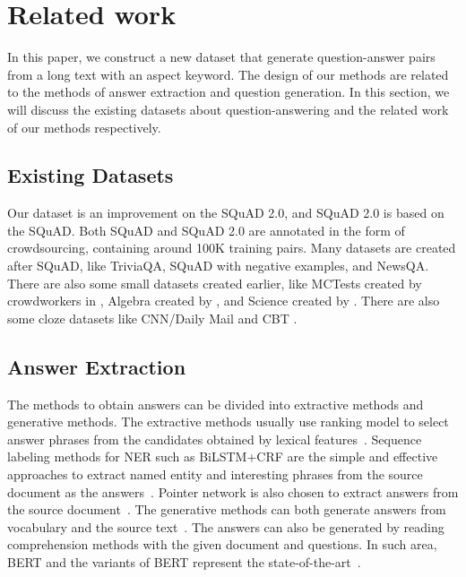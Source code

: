 \section{Related work}
\label{sec:related}


In this paper, we construct a new dataset that generate question-answer pairs from a long text with an aspect keyword.
The design of our methods are related to the methods of answer extraction and question generation.
In this section, we will discuss the existing datasets about question-answering and the related work of our methods respectively.

\subsection{Existing Datasets}
Our dataset is an improvement on the SQuAD 2.0\cite{rajpurkar2018know}, and SQuAD 2.0 is based on the SQuAD\cite{rajpurkar2016squad}. Both SQuAD and SQuAD 2.0 are annotated in the form of crowdsourcing, containing around 100K training pairs. Many datasets are created after SQuAD, like TriviaQA\cite{joshi2017triviaqa}, SQuAD with negative examples\cite{clark2017simple}, and NewsQA\cite{trischler2016newsqa}. There are also some small datasets created earlier, like MCTests created by crowdworkers in \citep{richardson2013mctest}, Algebra created by \citep{kushman2014learning}, and Science created by \citep{clark2016my}. There are also some cloze datasets like CNN/Daily Mail \citep{chen2016thorough} and CBT \citep{hill2015goldilocks}.

\subsection{Answer Extraction}
The methods to obtain answers can be divided into extractive methods and generative methods. 
The extractive methods usually use ranking model to select answer phrases from the candidates obtained by lexical features~\cite{witten2005kea,liu2011automatic,wang2016ptr,subramanian2017neural}.
Sequence labeling methods for NER such as BiLSTM+CRF are the simple and effective approaches to extract named entity and interesting phrases from the source document as the answers~\cite{lample2016neural}.
Pointer network is also chosen to extract answers from the source document~\cite{subramanian2017neural}.
The generative methods can both generate answers from vocabulary and the source text~\cite{meng2017deep,chen2018keyphrase,ye2018semi}.
The answers can also be generated by reading comprehension methods with the given document and questions.
In such area, BERT and the variants of BERT represent the state-of-the-art~\cite{devlin2018bert,lan2019albert}.

